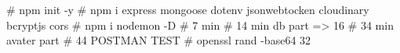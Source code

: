 # npm init -y
# npm i express mongoose dotenv jsonwebtocken cloudinary bcryptjs cors
# npm i nodemon -D
# 7 min
# 14 min db part => 16
# 34 min avater part
# 44 POSTMAN TEST
# openssl rand -base64 32


